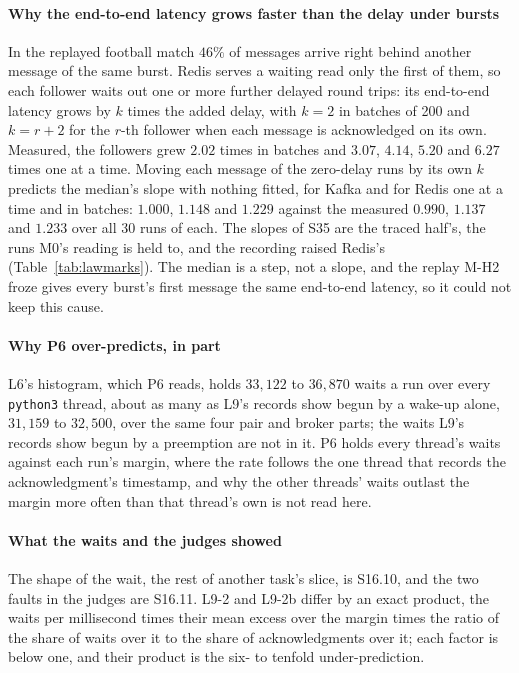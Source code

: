 \documentclass[10pt,journal,onecolumn]{IEEEtran}
\newcommand{\kafka}{Kafka}
\newcommand{\redis}{Redis}
\begin{document}
\paragraph{Why the end-to-end latency grows faster than the delay under bursts} In the replayed football
match $46\%$ of messages arrive right behind another message of the same burst. \redis{} serves
a waiting read only the first of them, so each follower waits out one or more further delayed
round trips: its end-to-end latency grows by $k$ times the added delay, with $k = 2$ in batches of 200 and
$k = r + 2$ for the $r$-th follower when each message is acknowledged on its own. Measured, the
followers grew $2.02$ times in batches and $3.07$, $4.14$, $5.20$ and $6.27$ times one at a time.
Moving each message of the zero-delay runs by its own $k$ predicts the median's slope with
nothing fitted, for \kafka{} and for \redis{} one at a time and in batches: $1.000$, $1.148$ and
$1.229$ against the measured $0.990$, $1.137$ and $1.233$ over all 30 runs of each. The slopes of
S35 are the traced half's, the runs M0's reading is held to, and the recording raised \redis{}'s
(Table~\ref{tab:lawmarks}). The median is a step, not a slope, and the replay M-H2 froze gives every burst's first message
the same end-to-end latency, so it could not keep this cause.

\paragraph{Why P6 over-predicts, in part} L6's histogram, which P6 reads, holds $33{,}122$ to
$36{,}870$ waits a run over every \texttt{python3} thread, about as many as L9's records show
begun by a wake-up alone, $31{,}159$ to $32{,}500$, over the same four pair and broker parts; the
waits L9's records show begun by a preemption are not in it. P6 holds every thread's waits
against each run's margin, where the rate follows the one thread that records the
acknowledgment's timestamp, and why the other threads' waits outlast the margin more often than
that thread's own is not read here.

\paragraph{What the waits and the judges showed} The shape of the wait, the rest of another task's
slice, is S16.10, and the two faults in the judges are S16.11. L9-2 and L9-2b differ by an exact
product, the waits per millisecond times their mean excess over the margin times the ratio of the
share of waits over it to the share of acknowledgments over it; each factor is below one, and
their product is the six- to tenfold under-prediction.
\end{document}

